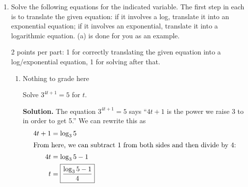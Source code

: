 \documentclass{article}
\begin{document}
\begin{enumerate}
\begin{enumerate}
  \item

    \begin{grading}
      1 point
    \end{grading}

    \begin{problem}[1in]
      Based on the picture, are your approximations overestimates or underestimates? Explain briefly. 
    \end{problem}

    \begin{solution}
      Based on the picture, our approximations
      are overestimates, because the tangent
      line to $y=\ln x$ at $x=1$
      is above the graph.
    \end{solution}

  \end{enumerate}

\item \label{intro-to-exp-log-equations}

  Solve the following equations for the indicated variable. The first step in each is to translate the given equation: if it involves a log, translate it into an exponential equation; if it involves an exponential, translate it into a logarithmic equation. (a) is done for you as an example.

  \begin{grading}
    2 points per part: 1 for correctly translating the given equation into a log/exponential equation, 1 for solving after that. 
  \end{grading}

  \begin{enumerate}
  \item

    \begin{grading}
      Nothing to grade here
    \end{grading}

    \begin{problem}
      Solve $3^{4t + 1} = 5$ for $t$. 
    \end{problem}

    \textbf{Solution.} The equation $3^{4t + 1} = 5$ says ``$4t + 1$ is the power we raise 3 to in order to get 5.'' We can rewrite this as
    \begin{align*}
      4t + 1 &= \log_3 5 \\
      \intertext{From here, we can subtract 1 from both sides and then divide by 4:}
      4t &= \log_3 5 - 1 \\
      t &= \boxed{\frac{\log_3 5 - 1}{4}} 
    \end{align*}


\end{enumerate}
\end{enumerate}
\end{document}
